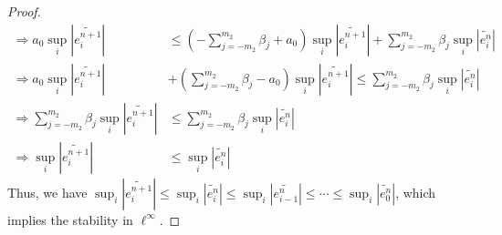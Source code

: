 \begin{answer}
\begin{proof}
$$\begin{aligned}
                \Rightarrow a_0 \sup_{i}\left\lvert \widetilde{e_{i}^{n+1}} \right\lvert &\leq  (-\sum_{j=-m_2}^{m_2} \beta_j+a_0)\sup_{i}\left\lvert \widetilde{e_{i}^{n+1}}\right\rvert + \sum_{j=-m_2}^{m_2} \beta_j\sup_{i}\left\lvert \widetilde{e_{i}^n}\right\rvert\\
                \Rightarrow a_0 \sup_{i}\left\lvert \widetilde{e_{i}^{n+1}} \right\lvert &+ (\sum_{j=-m_2}^{m_2} \beta_j-a_0)\sup_{i}\left\lvert \widetilde{e_{i}^{n+1}}\right\rvert \leq \sum_{j=-m_2}^{m_2} \beta_j\sup_{i}\left\lvert \widetilde{e_{i}^n}\right\rvert\\
                \Rightarrow \sum_{j=-m_2}^{m_2} \beta_j\sup_{i}\left\lvert \widetilde{e_{i}^{n+1}}\right\rvert &\leq \sum_{j=-m_2}^{m_2} \beta_j\sup_{i}\left\lvert \widetilde{e_{i}^n}\right\rvert\\
                \Rightarrow \sup_{i}\left\lvert \widetilde{e_{i}^{n+1}}\right\rvert &\leq \sup_{i}\left\lvert \widetilde{e_{i}^n}\right\rvert
            \end{aligned}
        $$
        Thus, we have $\sup_{i}\left\lvert \widetilde{e_{i}^{n+1}}\right\rvert \leq \sup_{i}\left\lvert \widetilde{e_{i}^n}\right\rvert \leq  \sup_{i}\left\lvert \widetilde{e_{i-1}^n}\right\rvert \leq \cdots \leq \sup_{i}\left\lvert \widetilde{e_{0}^n}\right\rvert$, which implies the stability in $\ell^{\infty}$.
    \end{proof}
\end{answer}